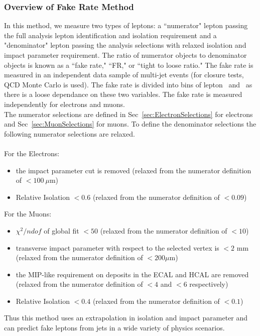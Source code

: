        		\subsubsection{Overview of Fake Rate Method}
		In this method, we measure two types of leptons: a ``numerator" lepton passing the full analysis lepton identification and isolation requirement  and a "denominator" lepton passing the analysis selections with relaxed isolation and impact parameter requirement. The ratio of numerator objects to denominator objects is known as a ``fake rate," ``FR," or ``tight to loose ratio."  The fake rate is measured in an independent data sample of multi-jet events (for closure tests, QCD Monte Carlo is used). The fake rate is divided into bins of lepton \pt \ and \aeta \ as there is a loose dependance on these two variables. The fake rate is measured independently for electrons and muons.\\

The numerator selections are defined in Sec~\ref{sec:ElectronSelections} for electrons and Sec~\ref{sec:MuonSelections} for muons. To define the denominator selections the following numerator selections are relaxed.\\\\
For the Electrons:
\begin{itemize}
\item the impact parameter cut is removed (relaxed from the numerator definition of $\lt 100 \ \mu$m)
\item Relative Isolation $\lt 0.6$ (relaxed from the numerator definition of $\lt 0.09$)
\end{itemize}
For the Muons:
\begin{itemize}
\item $\chi ^{2}/ndof$ of global fit $\lt 50$ (relaxed from the numerator definition of $\lt 10$)
\item transverse impact parameter with respect to the selected vertex is $\lt 2$ mm (relaxed from the numerator definition of $\lt 200 \mu$m)
\item the MIP-like requirement on deposits in the ECAL and HCAL are removed (relaxed from the numerator definition of $\lt 4$ and $\lt 6$ \GeV respectively)
\item Relative Isolation $\lt 0.4$ (relaxed from the numerator definition of $\lt 0.1$)
\end{itemize}


Thus this method uses an extrapolation in isolation and impact parameter and can predict fake leptons from jets in a wide variety of physics scenarios.\\

